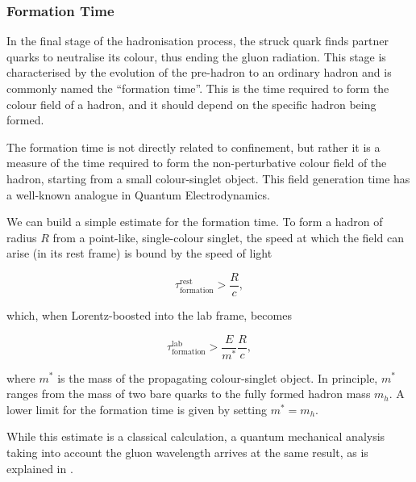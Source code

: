 \subsubsection{Formation Time}
\label{10.33::formation_time}
    In the final stage of the hadronisation process, the struck quark finds partner quarks to neutralise its colour, thus ending the gluon radiation.
    This stage is characterised by the evolution of the pre-hadron to an ordinary hadron and is commonly named the ``formation time''.
    This is the time required to form the colour field of a hadron, and it should depend on the specific hadron being formed.

    The formation time is not directly related to confinement, but rather it is a measure of the time required to form the non-perturbative colour field of the hadron, starting from a small colour-singlet object.
    This field generation time has a well-known analogue in Quantum Electrodynamics.

    We can build a simple estimate for the formation time.
    To form a hadron of radius $R$ from a point-like, single-colour singlet, the speed at which the field can arise (in its rest frame) is bound by the speed of light

    \begin{equation*}
        \tau^\text{rest}_\text{formation} > \frac{R}{c},
    \end{equation*}

    which, when Lorentz-boosted into the lab frame, becomes

    \begin{equation*}
        \tau^\text{lab}_\text{formation} > \frac{E}{m^*} \frac{R}{c},
    \end{equation*}

    where $m^*$ is the mass of the propagating colour-singlet object.
    In principle, $m^*$ ranges from the mass of two bare quarks to the fully formed hadron mass $m_h$.
    A lower limit for the formation time is given by setting $m^* = m_h$.

    While this estimate is a classical calculation, a quantum mechanical analysis taking into account the gluon wavelength arrives at the same result, as is explained in \cite{dokshitzer1991}.

